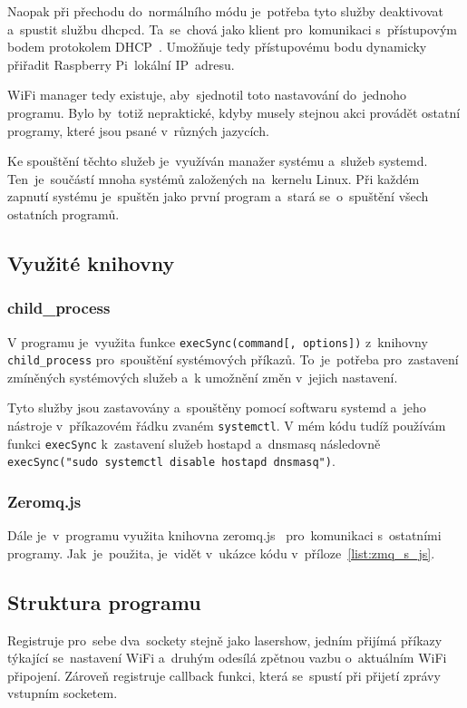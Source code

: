 Naopak při přechodu do~normálního  módu je~potřeba tyto služby deaktivovat a~spustit službu dhcpcd. Ta~se~chová jako klient pro~komunikaci s~přístupovým bodem protokolem DHCP~\cite{dhcpcd}. Umožňuje tedy přístupovému bodu dynamicky přiřadit Raspberry Pi~lokální IP~adresu.

WiFi manager tedy existuje, aby~sjednotil toto nastavování do~jednoho programu. Bylo by~totiž nepraktické, kdyby musely stejnou akci provádět ostatní programy, které jsou psané v~různých jazycích.

Ke spouštění těchto služeb je~využíván manažer systému a~služeb systemd. Ten~je~součástí mnoha systémů založených na~kernelu Linux. Při každém zapnutí systému je~spuštěn jako první program a~stará se~o~spuštění všech ostatních programů.~\cite{systemd}

\subsection{Využité knihovny}
\subsubsection{child\_process}
V programu je~využita funkce \texttt{execSync(command[, options])} z~knihovny \texttt{child_process} pro~spouštění systémových příkazů. To~je~potřeba pro~zastavení zmíněných systémových služeb a~k umožnění změn v~jejich nastavení.

Tyto služby jsou zastavovány a~spouštěny pomocí softwaru systemd a~jeho nástroje v~příkazovém řádku zvaném \texttt{systemctl}.
V mém kódu tudíž používám funkci \texttt{execSync} k~zastavení služeb hostapd a~dnsmasq následovně \texttt{execSync("sudo systemctl disable hostapd dnsmasq")}.

\subsubsection{Zeromq.js}
Dále je~v~programu využita knihovna zeromq.js~\cite{zeromqjs} pro~komunikaci s~ostatními programy. Jak~je~použita, je~vidět v~ukázce kódu v~příloze~\ref{list:zmq_s_js}.

\subsection{Struktura programu}

Registruje pro~sebe dva~sockety stejně jako lasershow, jedním přijímá příkazy týkající se~nastavení WiFi a~druhým odesílá zpětnou vazbu o~aktuálním WiFi připojení. Zároveň registruje callback funkci, která se~spustí při přijetí zprávy vstupním socketem.

